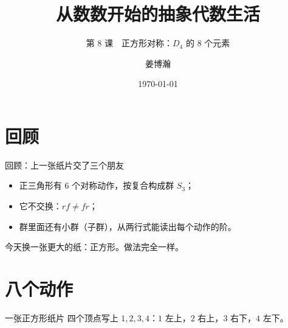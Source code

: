 \documentclass[10pt]{beamer}
\title{从数数开始的抽象代数生活}
\subtitle{第 8 课　正方形对称：\(D_4\) 的 \(8\) 个元素}
\author{姜博瀚}
\institute{厦门大学附属实验中学}
\date{\today}
\begin{document}
\begin{frame}
  \titlepage
\end{frame}

\section{回顾}

\begin{frame}{回顾：上一张纸片交了三个朋友}
  \begin{itemize}
    \item 正三角形有 \(6\) 个对称动作，按复合构成群 \(S_3\)；
    \item 它不交换：\(rf\neq fr\)；
    \item 群里面还有小群（子群），从两行式能读出每个动作的阶。
  \end{itemize}
  \pause
  \begin{center}
    {\large 今天换一张更大的纸：正方形。做法完全一样。}
  \end{center}
\end{frame}

\section{八个动作}

\begin{frame}{一张正方形纸片}
  四个顶点写上 \(1,2,3,4\)：\quad \(1\) 左上，\(2\) 右上，\(3\) 右下，\(4\) 左下。
\end{frame}
\end{document}
